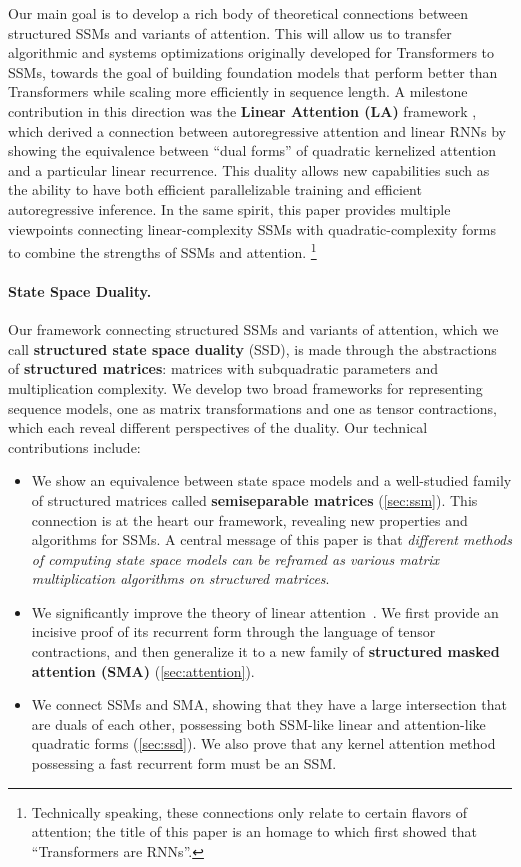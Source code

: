 Our main goal is to develop a rich body of theoretical connections between structured SSMs and variants of attention. This will allow us to transfer algorithmic and systems optimizations originally developed for Transformers to SSMs, towards the goal of building foundation models that perform better than Transformers while scaling more efficiently in sequence length. A milestone contribution in this direction was the \textbf{Linear Attention (LA)} framework \citep{katharopoulos2020transformers},
which derived a connection between autoregressive attention and linear RNNs by showing the equivalence between ``dual forms'' of quadratic kernelized attention and a particular linear recurrence. This duality allows new capabilities such as the ability to have both efficient parallelizable training and efficient autoregressive inference. In the same spirit, this paper provides multiple viewpoints connecting linear-complexity SSMs with quadratic-complexity forms to combine the strengths of SSMs and attention.
\footnote{Technically speaking, these connections only relate to certain flavors of attention; the title of this paper is an homage to \citep{katharopoulos2020transformers} which first showed that ``Transformers are RNNs''.}

\paragraph{State Space Duality.} Our framework connecting structured SSMs and variants of attention, which we call \textbf{structured state space duality} (SSD), is made through the abstractions of \textbf{structured matrices}: matrices with subquadratic parameters and multiplication complexity. We develop two broad frameworks for representing sequence models, one as matrix transformations and one as tensor contractions, which each reveal different perspectives of the duality. Our technical contributions include:

\begin{itemize}[leftmargin=*,itemsep=0pt,topsep=0pt]
  \item We show an equivalence between state space models and a well-studied family of structured matrices called \textbf{semiseparable matrices} (\ref{sec:ssm}).
    This connection is at the heart our framework, revealing new properties and algorithms for SSMs. A central message of this paper is that \emph{different methods of computing state space models can be reframed as various matrix multiplication algorithms on structured matrices}.
  \item We significantly improve the theory of linear attention~\citep{katharopoulos2020transformers}.
    We first provide an incisive proof of its recurrent form through the language of tensor contractions, and then generalize it to a new family of \textbf{structured masked attention (SMA)} (\ref{sec:attention}).
  \item We connect SSMs and SMA, showing that they have a large intersection that are duals of each other, possessing both SSM-like linear and attention-like quadratic forms (\ref{sec:ssd}).
    We also prove that any kernel attention method possessing a fast recurrent form must be an SSM.
\end{itemize}

